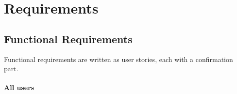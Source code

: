 \newpage



\chapter{Requirements}
\label{Requirements}

\section{Functional Requirements}
Functional requirements are written as user stories, each with a confirmation part.

\subsubsection*{All users}

